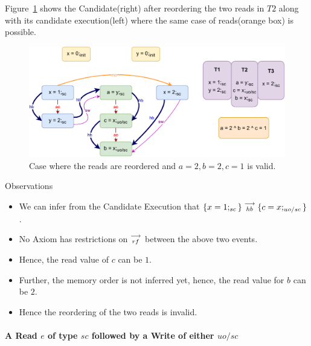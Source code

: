         Figure~\ref{reord_counter:example1(b)} shows the Candidate(right) after reordering the two reads in $T2$ along with its candidate execution(left) where the same case of reads(orange box) is possible. 
        \begin{figure}[H]
            \centering
            \includegraphics[scale=0.7]{7.CounterExamples/ReorderingCandidate/Example0R(Rsc-Ruo,sc).pdf}
            \caption{Case where the reads are reordered and $a = 2 , b = 2, c = 1$ is valid.}
            \label{reord_counter:example1(b)}
        \end{figure}

        Observations
        \begin{itemize}
            \item We can infer from the Candidate Execution that $\{x=1;_{sc}\}\stackrel{\longrightarrow}{_{hb}}\{c=x;_{uo/sc}\}$.
            \item No Axiom has restrictions on $\stackrel{\longrightarrow}{_{rf}}$ between the above two events.
            \item Hence, the read value of $c$ can be $1$.
            \item Further, the memory order is not inferred yet\footnotemark, hence, the read value for $b$ can be $2$.
            \item Hence the reordering of the two reads is invalid. 
        \end{itemize}

        
    
    \paragraph{A Read $e$ of type $sc$ followed by a Write of either $uo/sc$}
        
